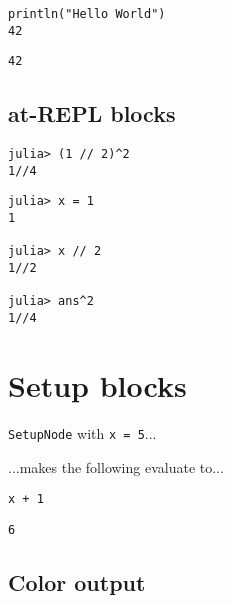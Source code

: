 \begin{verbatim}
println("Hello World")
42
\end{verbatim}


\begin{lstlisting}
42
\end{lstlisting}



\subsection{at-REPL blocks}



\label{9794080512499797594}{}



\begin{verbatim}
julia> (1 // 2)^2
1//4
\end{verbatim}




\begin{verbatim}
julia> x = 1
1

julia> x // 2
1//2

julia> ans^2
1//4
\end{verbatim}



\section{Setup blocks}



\label{5969831508618549664}{}


\texttt{SetupNode} with \texttt{x = 5}...





...makes the following evaluate to...




\begin{verbatim}
x + 1
\end{verbatim}


\begin{lstlisting}
6
\end{lstlisting}



\subsection{Color output}



\label{17347250707405175741}{}


